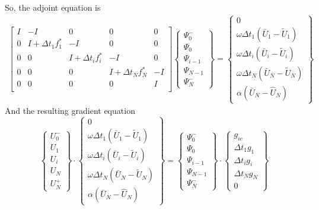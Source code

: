 \documentclass[10pt]{article}
\begin{document}
So, the adjoint equation is
\begin{eqnarray}
\left[ \begin{array}{ccccc} 
I & -I & 0 & 0 & 0 \\
0 & I + \Delta t_1 f^*_1 & -I & 0 & 0 \\
0 & 0 & I + \Delta t_i f^*_i & -I & 0 \\
0 & 0 & 0 & I + \Delta t_N f^*_N & -I \\
0 & 0 & 0 & 0 & I \\
\end{array} \right] 
\left\{\begin{array}{c} 
\Psi_0^- \\ \Psi_0 \\ \Psi_{i-1} \\ \Psi_{N-1} \\ \Psi_N^- 
\end{array}\right\}
=
\left\{\begin{array}{c} 
0 \\
\omega\Delta t_1(\bar U_1 - \tilde U_1) \\ 
\omega\Delta t_i(\bar U_i - \tilde U_i) \\ 
\omega\Delta t_N(\bar U_N - \tilde U_N) \\
\alpha (\bar U_N - \hat U_N)
\end{array}\right\}
\end{eqnarray}
And the resulting gradient equation
\begin{equation}
\left\{\begin{array}{c} U_0^- \\ U_1 \\ U_i \\ U_N \\ U^+_N \end{array}\right\}
\cdot
\left\{\begin{array}{c} 
0 \\
\omega\Delta t_1(\bar U_1 - \tilde U_1) \\ 
\omega\Delta t_i(\bar U_i - \tilde U_i) \\ 
\omega\Delta t_N(\bar U_N - \tilde U_N) \\
\alpha (\bar U_N - \hat U_N)
\end{array}\right\}
=
\left\{\begin{array}{c} 
\Psi_0^- \\ \Psi_0 \\ \Psi_{i-1} \\ \Psi_{N-1} \\ \Psi_N^- 
\end{array}\right\}
\cdot
\left\{\begin{array}{c} g_{ic} \\ \Delta t_1 g_1 \\ \Delta t_i g_i \\ 
\Delta t_N g_N \\ 0 
\end{array} \right\}
\end{equation}
\end{document}
